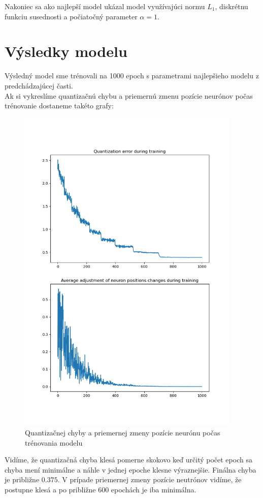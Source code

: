 \documentclass[a4paper]{article}
\begin{document}
	Nakoniec sa ako najlepší model ukázal model využívajúci normu $L_1$, diskrétnu funkciu susednosti a počiatočný parameter $\alpha=1$.
	
	\section{Výsledky modelu}
	
	Výsledný model sme trénovali na 1000 epoch s parametrami najlepšieho modelu z predchádzajúcej časti.
	\\
	
	Ak si vykreslíme quantizačnú chybu a priemernú zmenu pozície neurónov počas trénovanie dostaneme takéto grafy:
	\newpage

	\begin{figure}[!h]
		\centering
		\includegraphics[width=0.95\textwidth]{../errors.png}
		\caption{Quantizačnej chyby a priemernej zmeny pozície neurónu počas trénovania modelu }
	\end{figure}
	
	Vidíme, že quantizačná chyba klesá pomerne skokovo keď určitý počet epoch sa chyba mení minimálne a náhle v jednej epoche klesne výraznejšie. Finálna chyba je približne $0.375$. V prípade priemernej zmeny pozície neutrónov vidíme, že postupne klesá a po približne 600 epochách je iba minimálna.
	\\
	
	
	  
\end{document}
